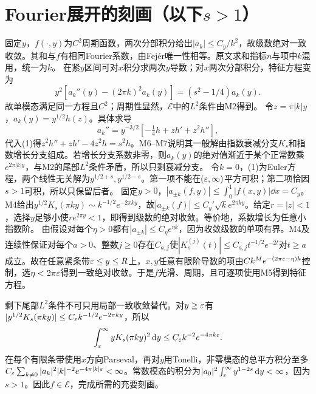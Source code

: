 \documentclass[UTF8,fontset=fandol,11pt]{ctexart}
\begin{document}
\section{Fourier展开的刻画（以下$s>1$）}
固定$y$，$f(\cdot,y)$为$C^2$周期函数，两次分部积分给出$|a_k|\le C_y/k^2$，故级数绝对一致收敛。其和与$f$有相同Fourier系数，由Fejér唯一性相等。原文求和指标$n$与项中$k$混用，统一为$k$。
在紧$y$区间可对$x$积分求两次$y$导数；对$x$两次分部积分，特征方程变为
\[y^2[a_k''(y)-(2\pi k)^2a_k(y)]=(s^2-1/4)a_k(y).\tag{1}\]
故单模态满足同一方程且$C^2$；周期性显然，$\mathcal E$中的$L^2$条件由M2得到。
令$z=\pi|k|y$，$a_k(y)=y^{1/2}h(z)$。具体求导
\[a_k''=y^{-3/2}[-\tfrac14h+zh'+z^2h''],\]
代入(1)得$z^2h''+zh'-4z^2h=s^2h$。M6--M7说明其一般解由指数衰减分支$K_s$和指数增长分支组成。若增长分支系数非零，则$a_k(y)$的绝对值渐近于某个正常数乘$e^{2\pi|k|y}$，与M2的尾部$L^2$条件矛盾，所以只剩衰减分支。
令$k=0$，(1)为Euler方程，两个线性无关解为$y^{1/2+s},y^{1/2-s}$。第一项不能在$(\varepsilon,\infty)$平方可积；第二项恰因$s>1$可积，所以只保留后者。
固定$y>0$，$|a_{\pm k}(f,y)|\le\int_0^1|f(x,y)|\dd x=C_y$。M4给出$y^{1/2}K_s(\pi ky)\sim k^{-1/2}e^{-2\pi ky}$，故$|a_{\pm k}(f)|\le C_y'\sqrt k e^{2\pi ky}$。给定$r=|z|<1$，选择$y$足够小使$re^{2\pi y}<1$，即得到级数的绝对收敛。等价地，系数增长为任意小指数阶。
由假设对每个$\eta>0$都有$|a_{\pm k}|\le C_\eta e^{\eta k}$，因为收敛级数的单项有界。M4及连续性保证对每个$a>0$、整数$j\ge0$存在$C_{a,j}$使$|K_s^{(j)}(t)|\le C_{a,j}t^{-1/2}e^{-2t}$对$t\ge a$成立。故在任意紧条带$\varepsilon\le y\le R$上，$x,y$任意有限阶导数的项由$Ck^Me^{-(2\pi\varepsilon-\eta)k}$控制，选$\eta<2\pi\varepsilon$得到一致绝对收敛。于是$f$光滑、周期，且可逐项使用M5得到特征方程。

剩下尾部$L^2$条件不可只用局部一致收敛替代。对$y\ge\varepsilon$有$|y^{1/2}K_s(\pi ky)|\le C_\varepsilon k^{-1/2}e^{-2\pi ky}$，所以
\[\int_\varepsilon^\infty yK_s(\pi ky)^2\,\mathrm d y\le C_\varepsilon k^{-2}e^{-4\pi k\varepsilon}.\]
在每个有限条带使用$x$方向Parseval，再对$y$用Tonelli，非零模态的总平方积分至多$C_\varepsilon\sum_{k\ne0}|a_k|^2|k|^{-2}e^{-4\pi|k|\varepsilon}<\infty$。常数模态的积分为$|a_0|^2\int_\varepsilon^\infty y^{1-2s}\,\mathrm d y<\infty$，因为$s>1$。因此$f\in\mathcal E$，完成所需的充要刻画。
\originalpages
\end{document}
